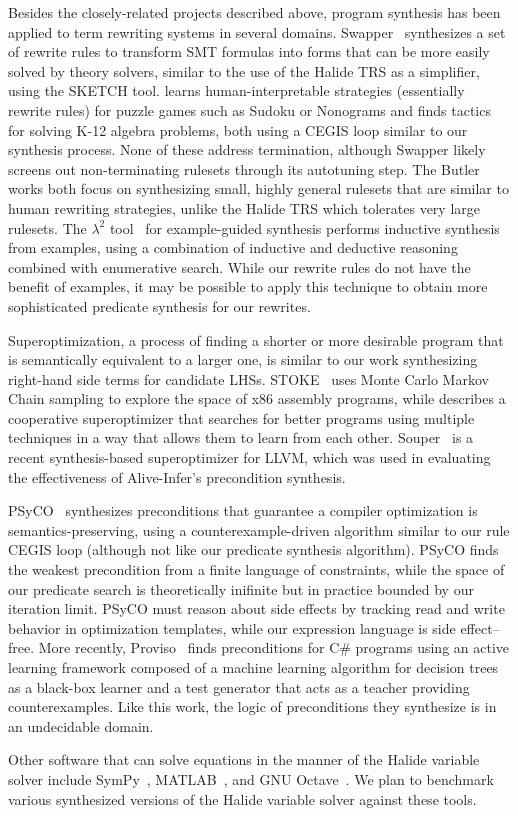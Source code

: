 Besides the closely-related projects described above, program synthesis has been applied to term rewriting systems in several domains. Swapper~\cite{singh2016swapper} synthesizes a set of rewrite rules to transform SMT formulas into forms that can be more easily solved by theory solvers, similar to the use of the Halide TRS as a simplifier, using the SKETCH tool. \citet{butler2017synthesizing} learns human-interpretable strategies (essentially rewrite rules) for puzzle games such as Sudoku or Nonograms and \citet{butler2018framework} finds tactics for solving K-12 algebra problems, both using a CEGIS loop similar to our synthesis process. None of these address termination, although Swapper likely screens out non-terminating rulesets through its autotuning step. The Butler works both focus on synthesizing small, highly general rulesets that are similar to human rewriting strategies, unlike the Halide TRS which tolerates very large rulesets.  The \textbf{$\lambda^2$} tool~\cite{feser2015lambda} for example-guided synthesis performs inductive synthesis from examples, using a combination of inductive and deductive reasoning combined with enumerative search.  While our rewrite rules do not have the benefit of examples, it may be possible to apply this technique to obtain more sophisticated predicate synthesis for our rewrites.

Superoptimization, a process of finding a shorter or more desirable program that is semantically equivalent to a larger one, is similar to our work synthesizing right-hand side terms for candidate LHSs. STOKE~\cite{schkufza2013stochastic} uses Monte Carlo Markov Chain sampling to explore the space of x86 assembly programs, while \citet{phothilimthana2016scaling} describes a cooperative superoptimizer that searches for better programs using multiple techniques in a way that allows them to learn from each other.  Souper~\cite{sasnauskas2017souper} is a recent synthesis-based superoptimizer for LLVM, which was used in evaluating the effectiveness of Alive-Infer's{} precondition synthesis.

PSyCO~\cite{lopes2014weakest} synthesizes preconditions that guarantee a compiler optimization is semantics-preserving, using a counterexample-driven algorithm similar to our rule CEGIS loop (although not like our predicate synthesis algorithm). PSyCO finds the weakest precondition from a finite language of constraints, while the space of our predicate search is theoretically inifinite but in practice bounded by our iteration limit. PSyCO must reason about side effects by tracking read and write behavior in optimization templates, while our expression language is side effect--free. More recently, Proviso~\cite{astorga2019learning} finds preconditions for C\# programs using an active learning framework composed of a machine learning algorithm for decision trees as a black-box learner and a test generator that acts as a teacher providing counterexamples. Like this work, the logic of preconditions they synthesize is in an undecidable domain.

Other software that can solve equations in the manner of the Halide variable solver include SymPy~\cite{10.7717/peerj-cs.103}, MATLAB~\cite{higham2016matlab}, and GNU Octave~\cite{eaton1997gnu}. We plan to benchmark various synthesized versions of the Halide variable solver against these tools. 